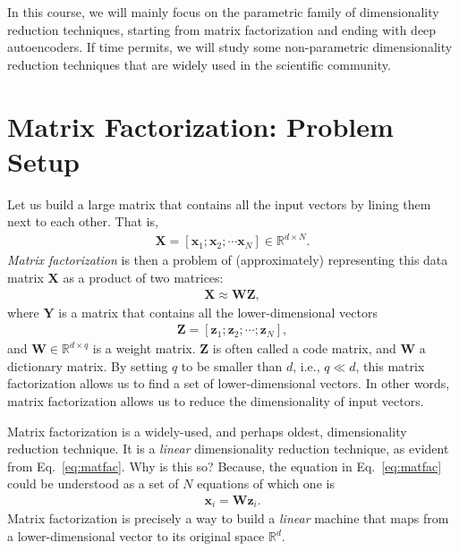 \documentclass{report}
\newcommand{\vect}[1]{\mathbf{#1}}
\newcommand{\matr}[1]{\mathbf{#1}}
\newcommand{\vx}[0]{\vect{x}}
\newcommand{\vz}[0]{\vect{z}}
\newcommand{\mW}[0]{\matr{W}}
\newcommand{\mZ}[0]{\matr{Z}}
\newcommand{\mX}[0]{\matr{X}}
\newcommand{\mY}[0]{\matr{Y}}
\newcommand{\RR}[0]{\mathbb{R}}
\begin{document}
In this course, we will mainly focus on the parametric family of dimensionality
reduction techniques, starting from matrix factorization and ending with deep
autoencoders. If time permits, we will study some non-parametric dimensionality
reduction techniques that are widely used in the scientific community.


\section{Matrix Factorization: Problem Setup}

Let us build a large matrix that contains all the input vectors by lining them
next to each other. That is,
\begin{align*}
    \mX = \left[ \vx_1; \vx_2; \cdots \vx_N \right] \in \RR^{d \times N}.
\end{align*}
{\it Matrix factorization} is then a problem of (approximately) representing
this data matrix $\mX$ as a product of two matrices:
\begin{align}
    \label{eq:matfac}
    \mX \approx \mW \mZ,
\end{align}
where $\mY$ is a matrix that contains all the lower-dimensional vectors
\begin{align*}
    \mZ =\left[ \vz_1; \vz_2; \cdots; \vz_N \right],
\end{align*}
and $\mW \in \RR^{d \times q}$ is a weight matrix. $\mZ$ is often called a code
matrix, and $\mW$ a dictionary matrix.  By setting $q$ to be smaller than $d$,
i.e., $q \ll d$, this matrix factorization allows us to find a set of
lower-dimensional vectors. In other words, matrix factorization allows us to
reduce the dimensionality of input vectors.

Matrix factorization is a widely-used, and perhaps oldest, dimensionality
reduction technique. It is a {\it linear} dimensionality reduction technique, as
evident from Eq.~\eqref{eq:matfac}. Why is this so? Because, the equation in
Eq.~\eqref{eq:matfac} could be understood as a set of $N$ equations of which
one is
\begin{align}
    \label{eq:matfac1}
    \vx_i = \mW \vz_i.
\end{align}
Matrix factorization is precisely a way to build a {\it linear} machine that
maps from a lower-dimensional vector to its original space $\RR^d$. 
\end{document}
